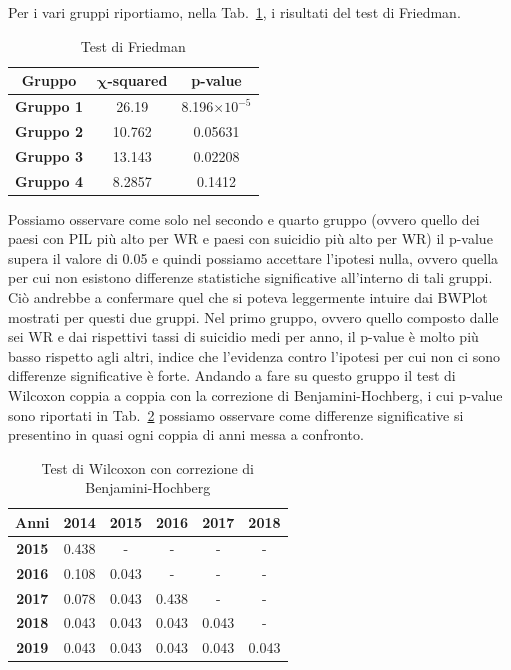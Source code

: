 \documentclass[conference]{IEEEtran}
\begin{document}
Per i vari gruppi riportiamo, nella Tab.~\ref{tab5}, i risultati del test di Friedman.
\begin{table}[htbp]
    \caption{Test di Friedman}
    \begin{center}
    \begin{tabular}{|c|c|c|}
    \hline
    \textbf{Gruppo} & $\boldsymbol{\chi}$\textbf{-squared} & \textbf{p-value} \\
    \hline
    \textbf{Gruppo 1} & 26.19 & 8.196$\times 10^{-5}$ \\\cline{1-3}
    \textbf{Gruppo 2} & 10.762 & 0.05631 \\\cline{1-3}
    \textbf{Gruppo 3} & 13.143 & 0.02208 \\\cline{1-3}
    \textbf{Gruppo 4} & 8.2857 & 0.1412 \\\cline{1-3}
    \hline
    \end{tabular}
    \label{tab5}
    \end{center}
\end{table}
Possiamo osservare come solo nel secondo e quarto gruppo 
(ovvero quello dei paesi con PIL più alto per WR e paesi con
suicidio più alto per WR)
il p-value supera il valore di 0.05
e quindi possiamo accettare l'ipotesi nulla, ovvero quella per cui non esistono differenze
statistiche significative all'interno di tali gruppi.
Ciò andrebbe a confermare quel che si poteva leggermente intuire dai BWPlot mostrati per questi
due gruppi.
Nel primo gruppo, ovvero quello composto dalle sei WR e dai rispettivi tassi di suicidio medi per
anno, il p-value è molto più basso rispetto agli altri, indice che
l'evidenza contro l'ipotesi per cui non ci sono differenze significative è forte.
Andando a fare su questo gruppo il
test di Wilcoxon coppia a coppia con la correzione di Benjamini-Hochberg,
i cui p-value sono riportati in Tab.~\ref{tab6} possiamo osservare come
differenze significative si presentino in quasi ogni coppia di anni
messa a confronto.
\begin{table}[htbp]
    \caption{Test di Wilcoxon con correzione di Benjamini-Hochberg}
    \begin{center}
    \begin{tabular}{|c|c|c|c|c|c|}
    \hline
    \textbf{Anni} & \textbf{2014} & \textbf{2015} & \textbf{2016} & \textbf{2017} & \textbf{2018} \\
    \hline
    \textbf{2015} & 0.438 & - & - & - & - \\ \hline
    \textbf{2016} & 0.108 & 0.043 & - & - & - \\ \hline
    \textbf{2017} & 0.078 & 0.043 & 0.438 & - & - \\ \hline
    \textbf{2018} & 0.043 & 0.043 & 0.043 & 0.043 & - \\ \hline
    \textbf{2019} & 0.043 & 0.043 & 0.043 & 0.043 & 0.043 \\ 
    \hline
    \end{tabular}
    \label{tab6}
    \end{center}
\end{table}
\end{document}
